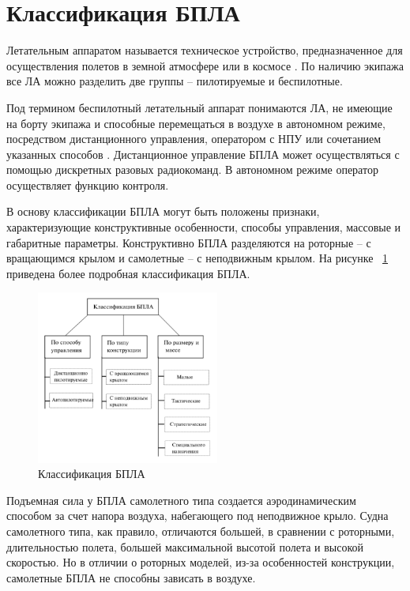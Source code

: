 \documentclass[nir, och, master]{SCWorks}
\begin{document}
\section{Классификация БПЛА}

Летательным аппаратом называется техническое устройство, предназначенное для осуществления полетов в земной 
атмосфере или в космосе \cite{11}. По наличию экипажа все ЛА можно разделить две группы – пилотируемые и беспилотные.

Под термином беспилотный летательный аппарат понимаются ЛА, не имеющие на борту экипажа и способные перемещаться 
в воздухе в автономном режиме, посредством дистанционного управления, оператором с НПУ или сочетанием указанных 
способов \cite{11}. Дистанционное управление БПЛА может осуществляться с помощью дискретных разовых радиокоманд. 
В автономном режиме оператор осуществляет функцию контроля.

В основу классификации БПЛА могут быть положены признаки, характеризующие конструктивные особенности, 
способы управления,  массовые и габаритные параметры. Конструктивно БПЛА разделяются на роторные – с 
вращающимся крылом и самолетные – с неподвижным крылом. На рисунке ~\ref{classification} приведена более подробная классификация БПЛА.

\begin{figure}[!ht]
	\centering
	\includegraphics[width=6cm]{img/uav_classification.png}
	\caption{\label{classification}%
	Классификация БПЛА}
\end{figure}

Подъемная сила у БПЛА самолетного типа создается аэродинамическим способом за счет 
напора воздуха, набегающего под неподвижное крыло. Судна самолетного типа, как правило, 
отличаются большей, в сравнении с роторными, длительностью полета, большей максимальной 
высотой полета и высокой скоростью. Но в отличии о роторных моделей, из-за особенностей 
конструкции, самолетные БПЛА не способны зависать в воздухе.
\end{document}
